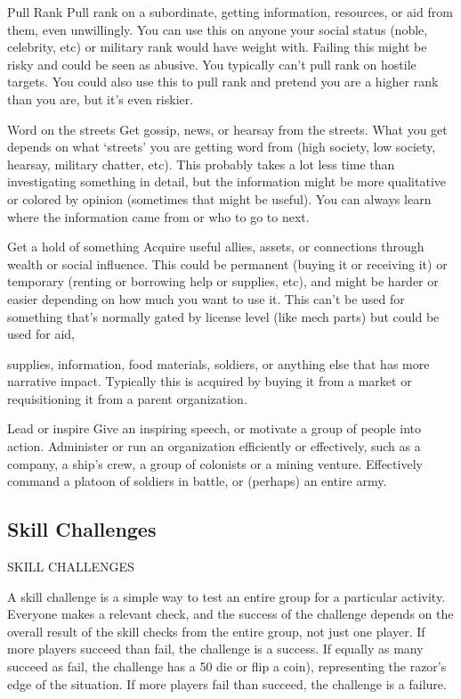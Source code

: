 Pull Rank
Pull rank on a subordinate, getting information, resources, or aid from them, even unwillingly. You
can use this on anyone your social status (noble, celebrity, etc) or military rank would have weight
with. Failing this might be risky and could be seen as abusive. You typically can’t pull rank on
hostile targets. You could also use this to pull rank and pretend you are a higher rank than you
are, but it’s even riskier.

Word on the streets
Get gossip, news, or hearsay from the streets. What you get depends on what ‘streets’ you are
getting word from (high society, low society, hearsay, military chatter, etc). This probably takes a
lot less time than investigating something in detail, but the information might be more qualitative
or colored by opinion (sometimes that might be useful). You can always learn where the
information came from or who to go to next.

Get a hold of something
Acquire useful allies, assets, or connections through wealth or social influence. This could be
permanent (buying it or receiving it) or temporary (renting or borrowing help or supplies, etc), and
might be harder or easier depending on how much you want to use it. This can’t be used for
something that’s normally gated by license level (like mech parts) but could be used for aid,




supplies, information, food materials, soldiers, or anything else that has more narrative impact.
Typically this is acquired by buying it from a market or requisitioning it from a parent organization.

Lead or inspire
Give an inspiring speech, or motivate a group of people into action. Administer or run an
organization efficiently or effectively, such as a company, a ship’s crew, a group of colonists or a
mining venture. Effectively command a platoon of soldiers in battle, or (perhaps) an entire army.

\subsection{Skill Challenges}
                                         SKILL CHALLENGES

A skill challenge is a simple way to test an entire group for a particular activity. Everyone makes a
relevant check, and the success of the challenge depends on the overall result of the skill checks
from the entire group, not just one player. If more players succeed than fail, the challenge is a
success. If equally as many succeed as fail, the challenge has a 50%
die or flip a coin), representing the razor’s edge of the situation. If more players fail than succeed,
the challenge is a failure.

